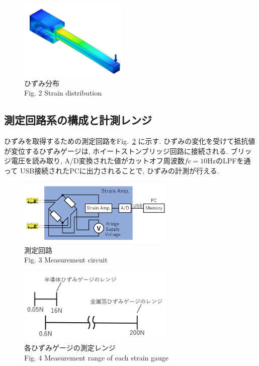 \begin{figure}[h]
  \begin{center}
    \includegraphics[width=5.2cm]{pic/simHizumi.jpg}
    \caption{ひずみ分布\\Fig. 2 Strain distribution}\label{fig:sim}
  \end{center}
\end{figure}

\subsection{測定回路系の構成と計測レンジ}
ひずみを取得するための測定回路をFig.~\ref{fig:sokuteikairo}
に示す. 
ひずみの変化を受けて抵抗値が変位するひずみゲージは, 
ホイートストンブリッジ回路に接続される. 
ブリッジ電圧を読み取り, A/D変換された値がカットオフ周波数$fc = 10$HzのLPFを通って
USB接続されたPCに出力されることで, ひずみの計測が行える. 
\begin{figure}[h]
  \begin{center}
    \includegraphics[width=7.5cm]{pic/sokuteikairo.jpg}
    \caption{測定回路\\Fig. 3 Measurement circuit}\label{fig:sokuteikairo}
  \end{center}
\end{figure}
\begin{figure}[h]
  \begin{center}
    \includegraphics[width=7.5cm]{pic/range.jpg}
    \caption{各ひずみゲージの測定レンジ\\Fig. 4 Measurement range of each strain gauge}\label{fig:range}
  \end{center}
\end{figure}

